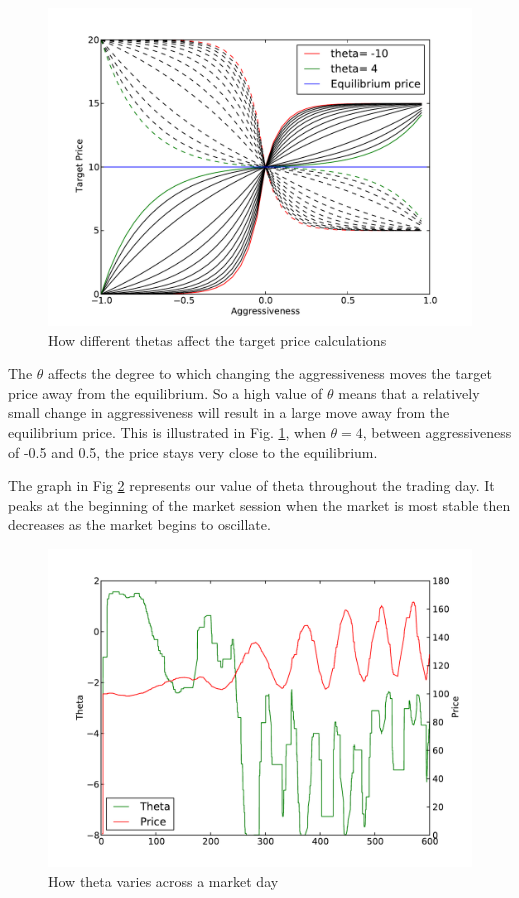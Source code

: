 \documentclass[preprint]{acm_proc_article-sp} %
\begin{document}
\begin{figure}
  \centering
  \label{fig:theta}
  \includegraphics[width=\columnwidth]{graphs_and_stats/graph_thetas.pdf}
  \caption{How different thetas affect the target price calculations}
\end{figure}

The $\theta$ affects the degree to which changing the aggressiveness moves the
target price  away from the equilibrium. So a high value of $\theta$ means that a
relatively small change in aggressiveness will result in a large move away from
the equilibrium price. This is illustrated in Fig. \ref{fig:theta}, when
$\theta=4$, between aggressiveness of -0.5 and 0.5, the price stays very close
to the equilibrium.

The graph in Fig \ref{fig:theta_v_time} represents our value of theta
throughout the trading day. It peaks at the beginning of the market session
when the market is most stable then decreases as the market begins to
oscillate.

\begin{figure}
  \centering
  \label{fig:theta_v_time}
  \includegraphics[width=\columnwidth]{graphs_and_stats/graph_theta_vs_time.pdf}
  \caption{How theta varies across a market day}
\end{figure}
\end{document}
